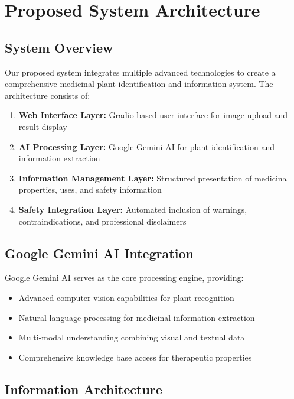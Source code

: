 \documentclass[conference]{IEEEtran}
\begin{document}
\section{Proposed System Architecture}

\subsection{System Overview}

Our proposed system integrates multiple advanced technologies to create a comprehensive medicinal plant identification and information system. The architecture consists of:

\begin{enumerate}
\item \textbf{Web Interface Layer:} Gradio-based user interface for image upload and result display
\item \textbf{AI Processing Layer:} Google Gemini AI for plant identification and information extraction
\item \textbf{Information Management Layer:} Structured presentation of medicinal properties, uses, and safety information
\item \textbf{Safety Integration Layer:} Automated inclusion of warnings, contraindications, and professional disclaimers
\end{enumerate}

\subsection{Google Gemini AI Integration}

Google Gemini AI serves as the core processing engine, providing:

\begin{itemize}
\item Advanced computer vision capabilities for plant recognition
\item Natural language processing for medicinal information extraction
\item Multi-modal understanding combining visual and textual data
\item Comprehensive knowledge base access for therapeutic properties
\end{itemize}

\subsection{Information Architecture}
\end{document}
